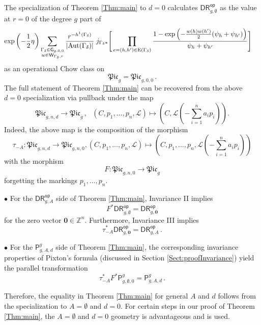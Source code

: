 \documentclass[a4paper,12pt]{article} %
\newcommand{\ca}[1]{{\mathcal{#1}}}
\newcommand{\bd}[1]{{\mathbf{#1}}}
\def\P{\mathsf{P}}
\def\Aut{{\rm Aut}}
\def\E{\mathrm{E}}
\def\V{\mathrm{V}}
\def\G{\mathsf{G}}
\theoremstyle{definition}
\theoremstyle{plain}%
\newcommand{\Picabs}{\mathfrak{Pic}}
\newcommand{\invnrn}{II}
\newcommand{\invnrA}{III}
\newcommand{\DRop}{\mathsf{DR}^{\mathsf{op}}}
\begin{document}
The specialization of Theorem \ref{Thm:main} to $d=0$ calculates $\DRop_{g,\emptyset}$ as
the value at $r=0$ of the degree $g$ part of
\begin{align*} %
\exp\left(-\frac12 \eta \right) \sum_{
\substack{\Gamma_\delta\in \G_{g,0,0} \\
w\in \mathsf{W}_{\Gamma_\delta,r}}
}
\frac{r^{-h^1(\Gamma_\delta)}}{|\Aut(\Gamma_\delta)| }
\;
j_{\Gamma_\delta*}\Bigg[&
\prod_{e=(h,h')\in \E(\Gamma_\delta)}
\frac{1-\exp\left(-\frac{w(h)w(h')}2(\psi_h+\psi_{h'})\right)}{\psi_h + \psi_{h'}} \Bigg]\,  %
\end{align*}
as an operational Chow class on 
$$\Picabs_g=\Picabs_{g,0,0}\, .$$
The full
statement of Theorem \ref{Thm:main} can 
be recovered from the above $d=0$ specialization via pullback under the map
\[\Picabs_{g,n,d} \to \Picabs_{g}\, ,\ \ \  (C,p_1, \ldots, p_n, \ca L) \mapsto \left(C, \ca L\left(-\sum_{i=1}^n a_i p_i\right)\right).\]
Indeed, the above map is the composition of the morphism 
\[\tau_{-A} : \Picabs_{g,n,d} \to \Picabs_{g,n,0}, (C,p_1, \ldots, p_n, \ca L) \mapsto \left(C, p_1, \ldots, p_n, \ca L\left(-\sum_{i=1}^n a_i p_i\right)\right)\]
with the morphism $$F : \Picabs_{g,n,0} \to \Picabs_{g}$$ forgetting the markings $p_1, \ldots, p_n$. 

\vspace{5pt}
\noindent $\bullet$
For the $\DRop_{g,A}$ side of Theorem \ref{Thm:main}, 
Invariance \invnrn{} 
implies $$F^* \DRop_{g,\emptyset} = \DRop_{g,\bd 0}$$ for the zero vector $\bd 0 \in \mathbb{Z}^n$. Furthermore, Invariance \invnrA{} implies $$\tau_{-A}^*\DRop_{g,\bd 0} = \DRop_{g,A}\, .$$ 

\vspace{5pt}
\noindent $\bullet$ For the $\mathsf{P}^g_{g,A,d}$
side of Theorem \ref{Thm:main}, 
the corresponding invariance properties of Pixton's formula
(discussed in Section \ref{Sect:proofInvariance}) 
yield the parallel transformation 
$$\tau_{-A}^*F^*\mathsf{P}^g_{g,\emptyset,0} = \mathsf{P}^g_{g,A,d}\, .$$ 

\vspace{5pt}
\noindent Therefore, the equality in Theorem \ref{Thm:main} for general $A$ and $d$ follows from the specialization to $A=\emptyset$ and $d=0$.
For certain steps in our proof of Theorem \ref{Thm:main}, the 
$A=\emptyset$ and $d=0$
geometry is
advantageous and is used.
\end{document}
